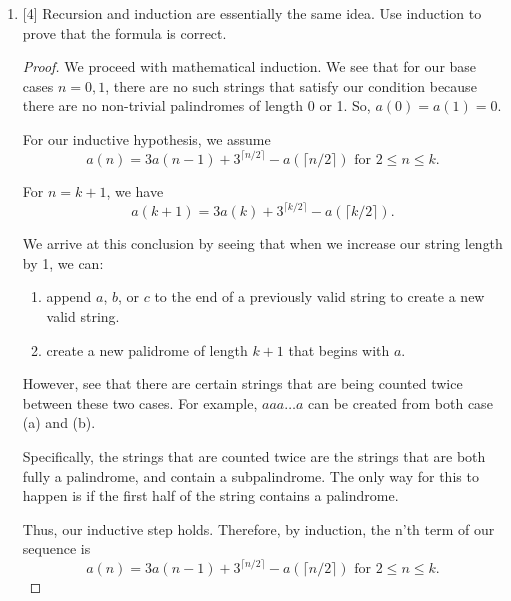 \documentclass{article}
\begin{document}
\begin{enumerate}
{\begin{itemize}
{                
            }
        \end{itemize}
    }

    \item {
        [4] Recursion and induction are essentially the same idea. Use induction 
        to prove that the formula is correct.

        \begin{proof}
            We proceed with mathematical induction. We see that for our base cases 
            \(n = 0, 1\), there are no such strings that satisfy our condition 
            because there are no non-trivial palindromes of length 0 or 1. So, 
            \(a(0) = a(1) = 0\).

            For our inductive hypothesis, we assume
            \[a(n) = 3a(n-1) + 3^{\lceil n/2 \rceil} - a(\lceil n/2 \rceil) \text{ for } 2 \le n \le k. \]

            For \(n = k+1\),  we have
            \[a(k+1) = 3a(k) + 3^{\lceil k/2 \rceil} -a(\lceil k/2 \rceil).\]

            We arrive at this conclusion by seeing that when we increase our string 
            length by 1, we can:
            \begin{enumerate}
                \item append \(a\), \(b\), or \(c\) to the end of a previously valid string to create a new valid string.
                \item create a new palidrome of length \(k+1\) that begins with \(a\). 
            \end{enumerate}

            However, see that there are certain strings that are being counted twice
            between these two cases. For example, \(aaa \dots a\) can be created 
            from both case (a) and (b). 

            Specifically, the strings that are counted twice are the strings that 
            are both fully a palindrome, and contain a subpalindrome. The only 
            way for this to happen is if the first half of the string contains a palindrome. 

            Thus, our inductive step holds. Therefore, by induction, the n'th 
            term of our sequence is 
            \[a(n) = 3a(n-1) + 3^{\lceil n/2 \rceil} - a(\lceil n/2 \rceil) \text{ for } 2 \le n \le k. \]
        \end{proof}
    }
\end{enumerate}


\end{document}
